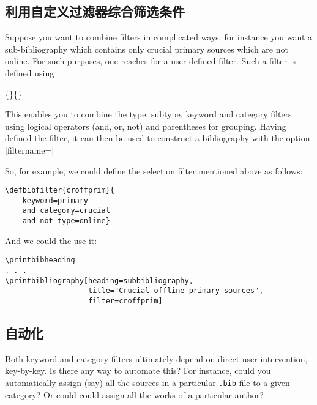 \subsection{利用自定义过滤器综合筛选条件}

Suppose you want to combine filters in complicated ways: for instance
you want a sub-bibliography which contains only crucial primary
sources which are not online. For such purposes, one reaches for a
user-defined filter. Such a filter is defined using
\begin{pseudoverb}
  \centering
  \{\}\{\}
\end{pseudoverb}
This enables you to combine the type, subtype, keyword and category
filters using logical operators (and, or, not) and parentheses for
grouping. Having defined the filter, it can then be used to construct
a bibliography with the option |filtername=|

So, for example, we could define the selection filter mentioned above
as follows:

\begin{Verbatim}
\defbibfilter{croffprim}{
    keyword=primary
    and category=crucial
    and not type=online}
\end{Verbatim}
And we could the use it:

\begin{Verbatim}
\printbibheading
. . .
\printbibliography[heading=subbibliography,
                   title="Crucial offline primary sources",
                   filter=croffprim]
\end{Verbatim}

\subsection{自动化}

Both keyword and category filters ultimately depend on direct user
intervention, key-by-key. Is there any way to automate this? For
instance, could you automatically assign (say) all the sources in a
particular \texttt{.bib} file to a given category? Or could could
assign all the works of a particular author?

